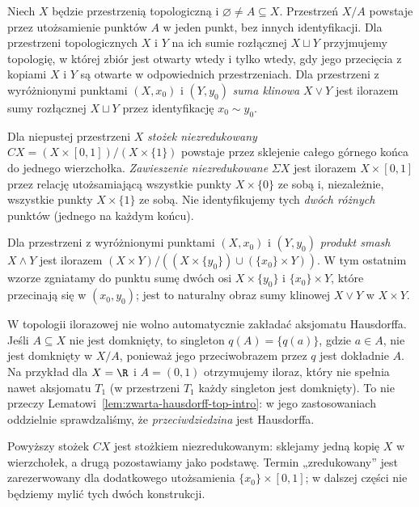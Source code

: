 \begin{definicja}
Niech $X$ będzie przestrzenią topologiczną i
$\varnothing\ne A\subseteq X$. Przestrzeń $X/A$ powstaje przez
utożsamienie punktów $A$ w jeden punkt, bez innych identyfikacji.
Dla przestrzeni topologicznych $X$ i $Y$ na ich sumie rozłącznej
$X\sqcup Y$ przyjmujemy topologię, w której zbiór jest otwarty
wtedy i tylko wtedy, gdy jego przecięcia z kopiami $X$ i $Y$
są otwarte w odpowiednich przestrzeniach.
Dla przestrzeni z wyróżnionymi punktami $(X,x_0)$ i $(Y,y_0)$
\emph{suma klinowa} $X\vee Y$ jest ilorazem sumy rozłącznej
$X\sqcup Y$ przez identyfikację $x_0\sim y_0$.

Dla niepustej przestrzeni $X$ \emph{stożek niezredukowany}
$CX=(X\times[0,1])/(X\times\{1\})$ powstaje przez
sklejenie całego górnego końca do jednego wierzchołka.
\emph{Zawieszenie niezredukowane} $\Sigma X$ jest ilorazem
$X\times[0,1]$ przez relację utożsamiającą wszystkie
punkty $X\times\{0\}$ ze sobą i, niezależnie,
wszystkie punkty $X\times\{1\}$ ze sobą.
Nie identyfikujemy tych \emph{dwóch różnych} punktów
(jednego na każdym końcu).

Dla przestrzeni z wyróżnionymi punktami $(X,x_0)$ i $(Y,y_0)$
\emph{produkt smash} $X\wedge Y$ jest ilorazem
$(X\times Y)/((X\times\{y_0\})\cup(\{x_0\}\times Y))$.
W tym ostatnim wzorze zgniatamy do punktu sumę dwóch osi
$X\times\{y_0\}$ i $\{x_0\}\times Y$,
które przecinają się w $(x_0,y_0)$; jest to naturalny obraz
sumy klinowej $X\vee Y$ w $X\times Y$.
\end{definicja}

\begin{uwaga}
\label{uw:iloraz-niehausdorff-top-intro}
W topologii ilorazowej nie wolno automatycznie
zakładać aksjomatu Hausdorffa. Jeśli $A\subseteq X$
nie jest domknięty, to singleton $q(A)=\{q(a)\}$, gdzie $a\in A$,
nie jest domknięty w $X/A$, ponieważ jego przeciwobrazem
przez $q$ jest dokładnie $A$. Na przykład dla
$X=\R$ i $A=(0,1)$ otrzymujemy iloraz, który
nie spełnia nawet aksjomatu $T_1$
(w przestrzeni $T_1$ każdy singleton jest domknięty).
To nie przeczy Lematowi~\ref{lem:zwarta-hausdorff-top-intro}:
w jego zastosowaniach oddzielnie sprawdzaliśmy,
że \emph{przeciwdziedzina} jest Hausdorffa.
\end{uwaga}

\begin{uwaga}
Powyższy stożek $CX$ jest stożkiem niezredukowanym:
sklejamy jedną kopię $X$ w wierzchołek, a drugą pozostawiamy
jako podstawę. Termin „zredukowany” jest zarezerwowany dla dodatkowego
utożsamienia $\{x_0\}\times[0,1]$; w dalszej części nie będziemy
mylić tych dwóch konstrukcji.
\end{uwaga}

